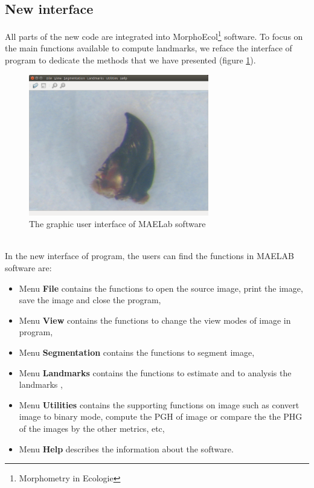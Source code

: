 \subsection{New interface}
All parts of the new code are integrated into MorphoEcol\footnote{Morphometry in Ecologie} software. To focus on the main functions available to compute landmarks, we reface the interface of program to dedicate the methods that we have presented (figure \ref{fig:44}).
\begin{figure}[h!]
\centering
\includegraphics[width=0.7\textwidth]{./images/software}
\caption{The graphic user interface of MAELab software}
\label{fig:44}
\end{figure}~\\
In the new interface of program, the users can find the functions in MAELAB software are:
\begin{itemize}
\item Menu \textbf{File} contains the functions to open the source image, print the image, save the image and close the program,
\item Menu \textbf{View} contains the functions to change the view modes of image in program,
\item Menu \textbf{Segmentation} contains the functions to segment image,
\item Menu \textbf{Landmarks} contains the functions to estimate and to analysis the landmarks ,
\item Menu \textbf{Utilities} contains the supporting functions on image such as convert image to binary mode, compute the PGH of image or compare the the PHG of the images by the other metrics, etc,
\item Menu \textbf{Help} describes the information about the software.
\end{itemize}
